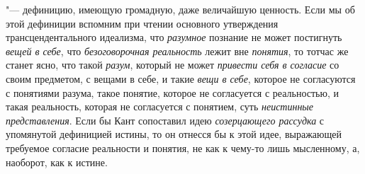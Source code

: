 "--- дефиницию, имеющую громадную, даже величайшую ценность.
Если мы об этой дефиниции вспомним при чтении основного утверждения
трансцендентального идеализма, что
{\em разумное} познание
не может постигнуть {\em вещей в себе},
что {\em безоговорочная
реальность} лежит вне
{\em понятия}, то тотчас
же станет ясно, что такой {\em разум},
который не может
{\em привести себя в согласие}
со своим предметом, с вещами в себе, и такие
{\em вещи в себе},
которое не согласуются с понятиями разума, такое понятие,
которое не согласуется с реальностью, и такая реальность, которая не
согласуется с понятием, суть
{\em неистинные представления}.
Если бы Кант сопоставил идею
{\em созерцающего рассудка}
с упомянутой дефиницией истины, то он отнесся бы к этой идее,
выражающей требуемое согласие реальности и понятия, не как к чему-то лишь
мысленному, а, наоборот, как к истине.

